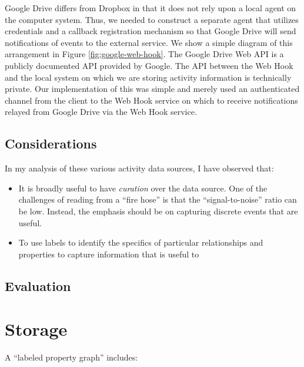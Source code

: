 \documentclass[sigconf,anonymous,review]{acmart}
\begin{document}
Google Drive differs from Dropbox in that it does not rely upon a local agent on
the computer system.  Thus, we needed to construct a separate agent that
utilizes credentials and a callback registration mechanism so that Google Drive
will send notifications of events to the external service.  We show a simple
diagram of this arrangement in Figure \ref{fig:google-web-hook}. The Google
Drive Web API is a publicly documented API provided by Google.  The API between
the Web Hook and the local system on which we are storing activity information
is technically private. Our implementation of this was simple and merely used an
authenticated channel from the client to the Web Hook service on which to
receive notifications relayed from Google Drive via the Web Hook service.

\subsection{Considerations}

In my analysis of these various activity data sources, I have observed that:

\begin{itemize}
    \item It is broadly useful to have \emph{curation} over the data source.
    One of the challenges of reading from a ``fire hose'' is that the
    ``signal-to-noise'' ratio can be low.  Instead, the emphasis should be on
    capturing discrete events that are useful.

    \item To use labels to identify the specifics of particular relationships
    and properties to capture information that is useful to
\end{itemize}

\subsection{Evaluation}

\section{Storage}
\label{sec:storage}

A ``labeled property graph'' includes:
\end{document}
